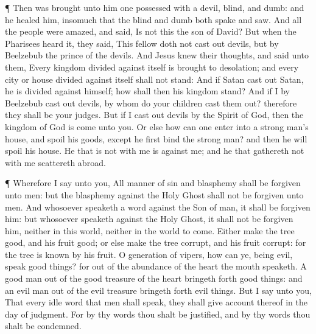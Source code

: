  ¶ Then was brought unto him one possessed with a devil,
blind, and dumb: and he healed him, insomuch that the blind and dumb
both spake and saw.  And all the people were amazed, and
said, Is not this the son of David?  But when the Pharisees
heard it, they said, This fellow doth not cast out devils, but by
Beelzebub the prince of the devils.  And Jesus knew their
thoughts, and said unto them, Every kingdom divided against itself is
brought to desolation; and every city or house divided against itself
shall not stand:  And if Satan cast out Satan, he is
divided against himself; how shall then his kingdom stand? 
And if I by Beelzebub cast out devils, by whom do your children cast
them out? therefore they shall be your judges.  But if I
cast out devils by the Spirit of God, then the kingdom of God is come
unto you.  Or else how can one enter into a strong man's
house, and spoil his goods, except he first bind the strong man? and
then he will spoil his house.  He that is not with me is
against me; and he that gathereth not with me scattereth abroad.

 ¶ Wherefore I say unto you, All manner of sin and
blasphemy shall be forgiven unto men: but the blasphemy against the Holy
Ghost shall not be forgiven unto men.  And whosoever
speaketh a word against the Son of man, it shall be forgiven him: but
whosoever speaketh against the Holy Ghost, it shall not be forgiven him,
neither in this world, neither in the world to come. 
Either make the tree good, and his fruit good; or else make the tree
corrupt, and his fruit corrupt: for the tree is known by his fruit.
 O generation of vipers, how can ye, being evil, speak good
things? for out of the abundance of the heart the mouth speaketh.
 A good man out of the good treasure of the heart bringeth
forth good things: and an evil man out of the evil treasure bringeth
forth evil things.  But I say unto you, That every idle
word that men shall speak, they shall give account thereof in the day of
judgment.  For by thy words thou shalt be justified, and by
thy words thou shalt be condemned.

